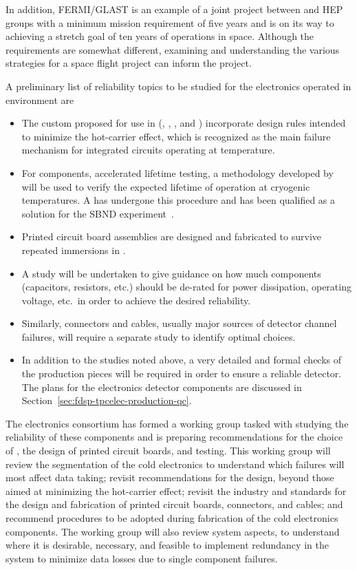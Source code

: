 In addition, FERMI/GLAST is an example of a joint project between  and HEP groups 
with a minimum mission requirement of five years and is on its way to achieving a 
stretch goal of ten years of operations in space. Although the requirements are somewhat 
different, examining and understanding the various strategies for a space 
flight project can inform the  project. 

A preliminary list of reliability topics to be studied for the  electronics operated 
in  environment are
\begin{itemize}
\item The custom  proposed for use in  (, 
, , and ) incorporate design rules 
intended to minimize the hot-carrier effect\cite{Li:CELAr,Hoff:2015hax}, 
which is recognized as the main failure mechanism for integrated circuits 
operating at  temperature.
\item For  components, accelerated lifetime testing, a methodology 
developed by ~\cite{nasa_nepp} will be used to verify the expected
lifetime of operation at cryogenic temperatures. A   has undergone
this procedure and has been qualified as a solution for the SBND experiment~\cite{Chen:2018zic}.
\item Printed circuit board assemblies are designed and fabricated to survive 
repeated immersions in \lntwo.
\item A study will be undertaken to give guidance on how much components (capacitors,
resistors, etc.) should be de-rated for power dissipation, operating voltage, etc.~in
order to achieve the desired reliability.
\item Similarly, connectors and cables, usually major sources of detector channel failures,
will require a separate study to identify optimal choices.
\item In addition to the  studies noted above, a very detailed
and formal  checks of the production pieces will be required in order to ensure
a reliable detector. The  plans for the  electronics
detector components are discussed in Section~\ref{sec:fdsp-tpcelec-production-qc}.
\end{itemize}
The  electronics consortium has formed a working group tasked with studying the reliability  
of these components and is preparing recommendations for the choice of , 
the design of printed circuit boards, and testing. This working group will review the 
segmentation of the cold electronics to understand which failures will most affect data taking; revisit recommendations for the  design, 
beyond those aimed at minimizing the hot-carrier effect; revisit the industry and 
 standards for the design and fabrication of printed circuit boards, connectors, 
and cables; and recommend  procedures to be adopted during 
fabrication of the cold electronics components. The working group will also review
system aspects, to understand where it is desirable, necessary, and feasible to implement 
redundancy in the system to minimize data losses due to single component failures. 
